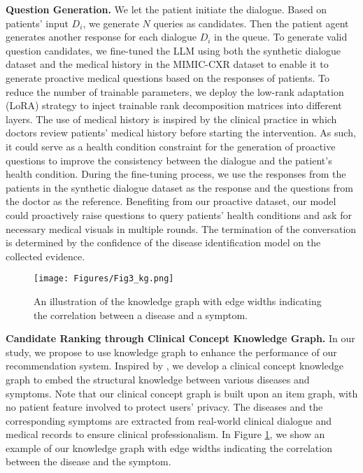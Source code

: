 \textbf{Question Generation.} We let the patient initiate the dialogue. Based on patients' input $D_i$, we generate $N$ queries as candidates. Then the patient agent generates another response for each dialogue $D_i$ in the queue. To generate valid question candidates, we fine-tuned the LLM using both the synthetic dialogue dataset and the medical history in the MIMIC-CXR dataset to enable it to generate proactive medical questions based on the responses of patients. To reduce the number of trainable parameters, we deploy the low-rank adaptation (LoRA) strategy \cite{Hu2021LoRALA, balazy2024lora} to inject trainable rank decomposition matrices into different layers. The use of medical history is inspired by the clinical practice in which doctors review patients' medical history before starting the intervention. As such, it could serve as a health condition constraint for the generation of proactive questions to improve the consistency between the dialogue and the patient's health condition. During the fine-tuning process, we use the responses from the patients in the synthetic dialogue dataset as the response and the questions from the doctor as the reference. Benefiting from our proactive dataset, our model could proactively raise questions to query patients' health conditions and ask for necessary medical visuals in multiple rounds. The termination of the conversation is determined by the confidence of the disease identification model on the collected evidence. 
\begin{figure}[t]
\centering
\texttt{[image: Figures/Fig3\_kg.png]}
\caption{An illustration of the knowledge graph with edge widths indicating the correlation between a disease and a symptom.}
\label{fig3_graph}
\end{figure}


\textbf{Candidate Ranking through Clinical Concept Knowledge Graph.} 
In our study, we propose to use knowledge graph \cite{Hogan_2021} to enhance the performance of our recommendation system. Inspired by \cite{zhang2016collaborative}, we develop a clinical concept knowledge graph to embed the structural knowledge between various diseases and symptoms. Note that our clinical concept graph is built upon an item graph, with no patient feature involved to protect users' privacy. The diseases and the corresponding symptoms are extracted from real-world clinical dialogue and medical records to ensure clinical professionalism. In Figure \ref{fig3_graph}, we show an example of our knowledge graph with edge widths indicating the correlation between the disease and the symptom. 

